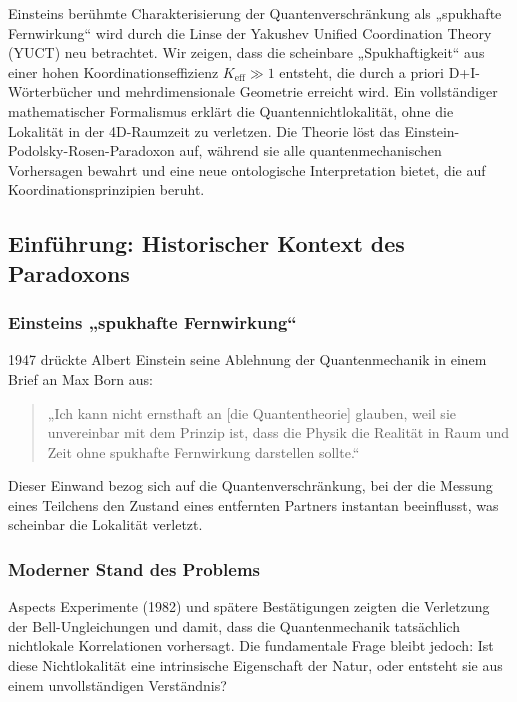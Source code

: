 \documentclass[11pt,a4paper]{article}
\begin{document}
	\begin{center}
		
	\end{center}
	
	Einsteins berühmte Charakterisierung der Quantenverschränkung als „spukhafte Fernwirkung“ wird durch die Linse der Yakushev Unified Coordination Theory (YUCT) neu betrachtet. Wir zeigen, dass die scheinbare „Spukhaftigkeit“ aus einer hohen Koordinationseffizienz $K_{\mathrm{eff}} \gg 1$ entsteht, die durch a priori D+I-Wörterbücher und mehrdimensionale Geometrie erreicht wird. Ein vollständiger mathematischer Formalismus erklärt die Quantennichtlokalität, ohne die Lokalität in der 4D-Raumzeit zu verletzen. Die Theorie löst das Einstein-Podolsky-Rosen-Paradoxon auf, während sie alle quantenmechanischen Vorhersagen bewahrt und eine neue ontologische Interpretation bietet, die auf Koordinationsprinzipien beruht.
	
	
	\subsection{Einführung: Historischer Kontext des Paradoxons}
	\label{subsec:einstein-historical}
	
	\subsubsection{Einsteins „spukhafte Fernwirkung“}
	1947 drückte Albert Einstein seine Ablehnung der Quantenmechanik in einem Brief an Max Born aus:
	
	\begin{quote}
		„Ich kann nicht ernsthaft an [die Quantentheorie] glauben, weil sie unvereinbar mit dem Prinzip ist, dass die Physik die Realität in Raum und Zeit ohne spukhafte Fernwirkung darstellen sollte.“
	\end{quote}
	
	Dieser Einwand bezog sich auf die Quantenverschränkung, bei der die Messung eines Teilchens den Zustand eines entfernten Partners instantan beeinflusst, was scheinbar die Lokalität verletzt.
	
	\subsubsection{Moderner Stand des Problems}
	Aspects Experimente (1982) und spätere Bestätigungen zeigten die Verletzung der Bell-Ungleichungen und damit, dass die Quantenmechanik tatsächlich nichtlokale Korrelationen vorhersagt. Die fundamentale Frage bleibt jedoch: Ist diese Nichtlokalität eine intrinsische Eigenschaft der Natur, oder entsteht sie aus einem unvollständigen Verständnis?
	
\end{document}
